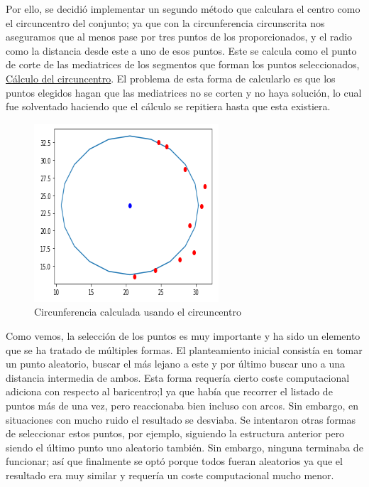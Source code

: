 \documentclass[conference,a4paper]{IEEEtran}
\begin{document}
Por ello, se decidió implementar un segundo método que calculara el centro como el circuncentro del conjunto; ya que con la circunferencia circunscrita nos aseguramos que al menos pase por tres puntos de los proporcionados, y el radio como la distancia desde este a uno de esos puntos. Este se calcula como el punto de corte de las mediatrices de los segmentos que forman los puntos seleccionados, \hyperref[bib:georgeSeif]{Cálculo del circuncentro}. El problema de esta forma de calcularlo es que los puntos elegidos hagan que las mediatrices no se corten y no haya solución, lo cual fue solventado haciendo que el cálculo se repitiera hasta que esta existiera.\\

\begin{figure}[H]
\centering
\includegraphics[scale=0.8]{ArcoCircuncentroResultado}
\caption{Circunferencia calculada usando el circuncentro}
\end{figure}

Como vemos, la selección de los puntos es muy importante y ha sido un elemento que se ha tratado de múltiples formas. El planteamiento inicial  consistía en tomar un punto aleatorio, buscar el más lejano a este y por último buscar uno a una distancia intermedia de ambos. Esta forma requería cierto coste computacional adiciona con respecto al baricentro;l ya que había que recorrer el listado de puntos más de una vez, pero reaccionaba bien incluso con arcos. Sin embargo, en situaciones con mucho ruido el resultado se desviaba. Se intentaron otras formas de seleccionar estos puntos, por ejemplo, siguiendo la estructura anterior pero siendo el último punto uno aleatorio también. Sin embargo, ninguna terminaba de funcionar; así que finalmente se optó porque todos fueran aleatorios ya que el resultado era muy similar y requería un coste computacional mucho menor.\\
\end{document}

